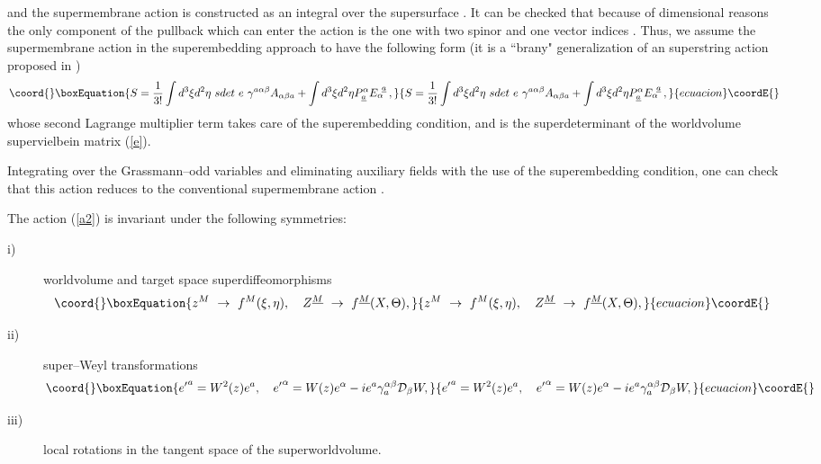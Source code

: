 \documentclass[a4paper,12pt]{article}
\begin{document}
and the supermembrane action is constructed as an integral over
the supersurface \coordHE{}. It can be
checked that because of dimensional reasons the only component of
the \coordHE{} pullback which can enter the action is the one with
two spinor and one vector indices \coordHE{}. Thus, we
assume the supermembrane action in the superembedding approach to
have the following form \cite{pst} (it is a ``brany"
generalization of an \coordHE{} superstring action proposed in
\cite{tonin})
\begin{equation}\coord{}\boxEquation{\label{a2}
S={1\over{3!}}\int d^3\xi
d^2\eta~sdet{~e}~\gamma^{a\alpha\beta}A_{\alpha\beta a}+
\int d^3\xi d^2\eta P^\alpha_{\underline a}E^{~\underline
a}_{\alpha} \,,
}{S={1\over{3!}}\int d^3\xi
d^2\eta~sdet{~e}~\gamma^{a\alpha\beta}A_{\alpha\beta a}+
\int d^3\xi d^2\eta P^\alpha_{\underline a}E^{~\underline
a}_{\alpha} \,,
}{ecuacion}\coordE{}\end{equation}
whose second Lagrange multiplier term takes care of the
superembedding condition, and \coordHE{} is the superdeterminant
of the worldvolume supervielbein matrix \coordHE{} (\ref{e}).

Integrating over the Grassmann--odd variables and eliminating
auxiliary fields with the use of the superembedding condition,
one can check that this action reduces to the conventional
supermembrane action \cite{bst1}.

The action (\ref{a2}) is invariant under the following symmetries:
\begin{description}
\item[i)]
worldvolume and target space superdiffeomorphisms
\begin{equation}\coord{}\boxEquation{\label{sd}
z^M~\rightarrow~f^M(\xi,\eta), \quad Z^{\underline
M}~\rightarrow~f^{\underline M}(X,\Theta),
}{z^M~\rightarrow~f^M(\xi,\eta), \quad Z^{\underline
M}~\rightarrow~f^{\underline M}(X,\Theta),
}{ecuacion}\coordE{}\end{equation}
\item[ii)]
super--Weyl transformations
\begin{equation}\coord{}\boxEquation{\label{superW}
{e'}^a=W^2(z)e^a, \quad
{e'}^\alpha=W(z)e^\alpha-ie^a\gamma_a^{\alpha\beta}{\cal D}_\beta
W,
}{{e'}^a=W^2(z)e^a, \quad
{e'}^\alpha=W(z)e^\alpha-ie^a\gamma_a^{\alpha\beta}{\cal D}_\beta
W,
}{ecuacion}\coordE{}\end{equation}
\item[iii)]
local \coordHE{} rotations in the tangent space of the
superworldvolume.
\end{description}
\end{document}
